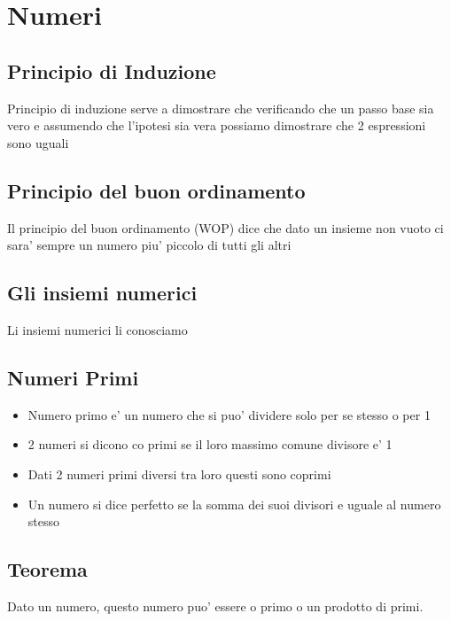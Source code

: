 \documentclass{article}
\begin{document}
  \section{Numeri}
  \subsection{Principio di Induzione}
  \begin{flushleft}
    Principio di induzione serve a dimostrare che verificando che un passo base sia vero
    e assumendo che l'ipotesi sia vera possiamo dimostrare che 2 espressioni sono uguali
  \end{flushleft}
  \subsection{Principio del buon ordinamento}
  \begin{flushleft}
    Il principio del buon ordinamento (WOP) dice che dato un insieme non vuoto ci sara' sempre 
    un numero piu' piccolo di tutti gli altri
  \end{flushleft}
  \subsection{Gli insiemi numerici}
  \begin{flushleft}
    Li insiemi numerici li conosciamo
  \end{flushleft}
  \subsection{Numeri Primi}
  \begin{itemize}
    \item Numero primo e' un numero che si puo' dividere solo per se stesso o per 1
    \item 2 numeri si dicono co primi se il loro massimo comune divisore e' 1
    \item Dati 2 numeri primi diversi tra loro questi sono coprimi
    \item Un numero si dice perfetto se la somma dei suoi divisori e uguale al numero stesso
  \end{itemize}
  \subsection*{Teorema}
  \begin{flushleft}
    Dato un numero, questo numero puo' essere o primo o un prodotto di primi.
  \end{flushleft}
\end{document}
